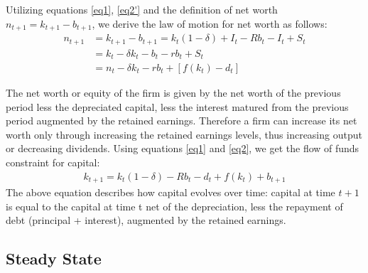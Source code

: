 \documentclass[12pt]{report}
\begin{document}
Utilizing equations \ref{eq1}, \ref{eq2'} and the definition of net worth \(n_{t+1}=k_{t+1}-b_{t+1}\), we derive the law of motion for net worth as follows:
\begin{align*}
    n_{t+1}&=k_{t+1}-b_{t+1} = k_{t}(1-\delta) + I_t - R b_{t} - I_t + S_{t} \\
    &= k_{t} - \delta k_{t} - b_{t} - r b_{t}+ S_t \\
    &= n_{t} - \delta k_{t} - r b_{t} + \left[f\left({k_t}\right) - d_t \right]
\end{align*}

The net worth or equity of the firm is given by the net worth of the previous period less the depreciated capital, less
the interest matured from the previous period augmented by the retained earnings. Therefore a firm can increase its
net worth only through increasing the retained earnings levels, thus increasing output or decreasing dividends.
Using equations \ref{eq1} and \ref{eq2}, we get the flow of funds constraint for capital:
\begin{align}
    k_{t+1}=k_{t}(1-\delta)- R b_{t} - d_t + f(k_{t})+b_{t+1} \label{eq3}
\end{align}
The above equation describes how capital evolves over time: capital at time \(t+1\) is equal to the capital at time t
net of the depreciation, less the repayment of debt (principal + interest), augmented by the retained earnings. %

\subsection{Steady State}
\end{document}
